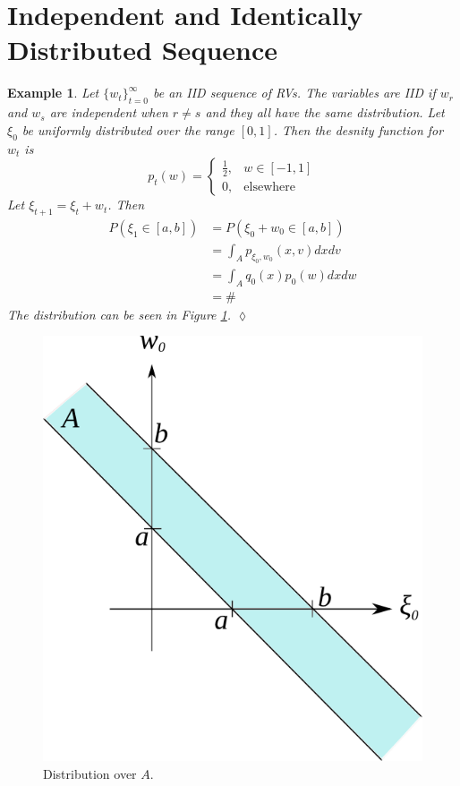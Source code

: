 \documentclass[lecture,12pt,]{pcms-l}
\theoremstyle{example}
\newtheorem{example}{Example}[section]
\begin{document}
\section{Independent and Identically Distributed Sequence}
\begin{example}
Let $\lbrace w_t\rbrace_{t=0}^\infty$ be an IID sequence of RVs. The variables are IID if $w_r$ and $w_s$ are independent when $r\neq s$ and they all have the same distribution. Let $\xi_0$ be uniformly distributed over the range $[0,1]$. Then the desnity function for $w_t$ is
$$p_t(w) = \begin{cases} \frac{1}{2}, & w\in[-1,1] \\ 0, & \text{elsewhere} \end{cases}$$
Let $\xi_{t+1}=\xi_t+w_t$. Then
\begin{align*}
P(\xi_1\in[a,b]) &= P(\xi_0 + w_0\in[a,b]) \\
&= \int_A p_{\xi_0,w_0}(x,v)dxdv \\
&= \int_A q_0(x)p_0(w)dxdw \\
&= \#
\end{align*}
The distribution can be seen in Figure \ref{fig:02iid}.
$\lozenge$
\end{example}
\begin{figure}[ht!]
	\centering
	\includegraphics[width=.3\textwidth]{images/02iid}
	\caption{Distribution over $A$.}
	\label{fig:02iid}
\end{figure}
\end{document}
